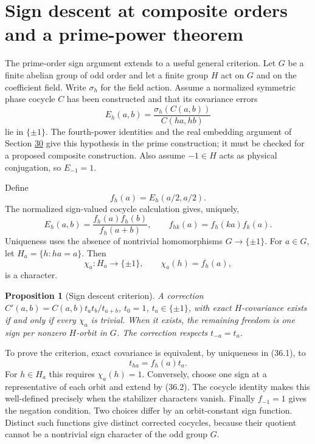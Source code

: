 \documentclass[11pt,reqno]{amsart}
\theoremstyle{plain}
\newtheorem{proposition}[theorem]{Proposition}
\begin{document}
\section{Sign descent at composite orders and a prime-power theorem}\label{sec:36}

The prime-order sign argument extends to a useful general criterion.
Let \(G\) be a finite abelian group of odd order and let a finite
group \(H\) act on \(G\) and on the coefficient field. Write
\(\sigma_h\) for the field action. Assume a normalized symmetric
phase cocycle \(C\) has been constructed and that its covariance
errors
\[
 E_h(a,b)=\frac{\sigma_h(C(a,b))}{C(ha,hb)}
\]
lie in \(\{\pm1\}\). The fourth-power identities and the real
embedding argument of Section \hyperref[sec:30]{30} give this hypothesis in the prime
construction; it must be checked for a proposed composite
construction. Also assume \(-1\in H\) acts as physical conjugation,
so \(E_{-1}=1\).

Define
\[
 f_h(a)=E_h(a/2,a/2).
\]
The normalized sign-valued cocycle calculation gives, uniquely,
\begin{equation*}
 E_h(a,b)=\frac{f_h(a)f_h(b)}{f_h(a+b)},\qquad
 f_{hk}(a)=f_h(ka)f_k(a). \tag{36.1}
\end{equation*}
Uniqueness uses the absence of nontrivial homomorphisms
\(G\to\{\pm1\}\). For \(a\in G\), let
\(H_a=\{h:ha=a\}\). Then
\[
 \chi_a:H_a\longrightarrow\{\pm1\},\qquad
 \chi_a(h)=f_h(a),
\]
is a character.

\begin{proposition}[Sign descent criterion]
A correction
\(C'(a,b)=C(a,b)t_at_b/t_{a+b}\), \(t_0=1\),
\(t_a\in\{\pm1\}\), with exact \(H\)-covariance exists if
and only if every \(\chi_a\) is trivial. When it exists, the
remaining freedom is one sign per nonzero \(H\)-orbit in \(G\).
The correction respects \(t_{-a}=t_a\).
\end{proposition}

To prove the criterion, exact covariance is equivalent, by uniqueness
in (36.1), to
\begin{equation*}
 t_{ha}=f_h(a)t_a. \tag{36.2}
\end{equation*}
For \(h\in H_a\) this requires \(\chi_a(h)=1\). Conversely,
choose one sign at a representative of each orbit and extend by
(36.2). The cocycle identity makes this well-defined precisely when
the stabilizer characters vanish. Finally \(f_{-1}=1\) gives the
negation condition. Two choices differ by an orbit-constant sign
function. Distinct such functions give distinct corrected cocycles,
because their quotient cannot be a nontrivial sign character of the
odd group \(G\).
\end{document}
